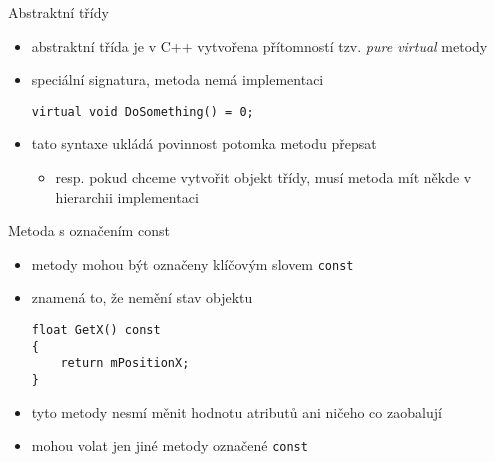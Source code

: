 \documentclass{beamer}
\begin{document}
\begin{xframe}{Abstraktní třídy}
	\begin{itemize}
		\item abstraktní třída je v C++ vytvořena přítomností tzv. \emph{pure virtual} metody
		\item speciální signatura, metoda nemá implementaci
\begin{lstlisting}[basicstyle=\fontsize{9}{10}\selectfont\ttfamily]
virtual void DoSomething() = 0;
\end{lstlisting}
		\item tato syntaxe ukládá povinnost potomka metodu přepsat
			\begin{itemize}
				\item resp. pokud chceme vytvořit objekt třídy, musí metoda mít někde v hierarchii implementaci
			\end{itemize}
	\end{itemize}
\end{xframe}


\begin{xframe}{Metoda s označením const}
	\begin{itemize}
		\item metody mohou být označeny klíčovým slovem \texttt{const}
		\item znamená to, že nemění stav objektu
\begin{lstlisting}[basicstyle=\fontsize{9}{10}\selectfont\ttfamily]
float GetX() const
{
    return mPositionX;
}
\end{lstlisting}
		\item tyto metody nesmí měnit hodnotu atributů ani ničeho co zaobalují
		\item mohou volat jen jiné metody označené \texttt{const}
	\end{itemize}
\end{xframe}
\end{document}
